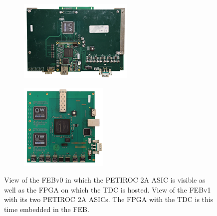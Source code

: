 	\begin{figure}[H]
		\begin{subfigure}{0.5\linewidth}
		    \centering
			\includegraphics[width = 0.8\linewidth]{fig/chapt6/iRPC-RPCROCv0.png}
			\caption{\label{fig:RPCROC_FEB:A}}
		\end{subfigure}
		\begin{subfigure}{0.5\linewidth}
		    \centering
			\includegraphics[width = 0.7\linewidth]{fig/chapt6/iRPC-RPCROCv1.png}
			\caption{\label{fig:RPCROC_FEB:B}}
		\end{subfigure}
		\caption{\label{fig:RPCROC_FEB}  View of the FEBv0 in which the PETIROC 2A ASIC is visible as well as the FPGA on which the TDC is hosted.  View of the FEBv1 with its two PETIROC 2A ASICs. The FPGA with the TDC is this time embedded in the FEB.}
	\end{figure}

